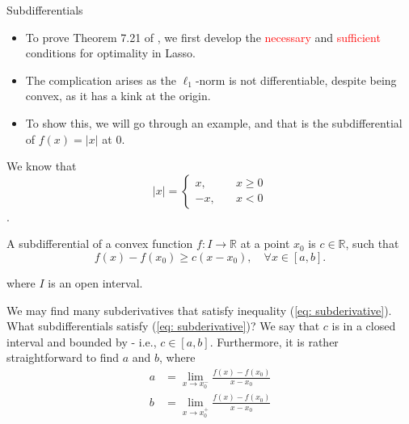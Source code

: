 \documentclass[10pt,handout,english]{beamer}
\newcommand{\R}{\mathbb{R}}
\begin{document}
\begin{frame}[allowframebreaks]{Subdifferentials}
\begin{itemize}
\item To prove Theorem 7.21 of \citet{wainwright2019high}, we first develop the \textcolor{red}{necessary} and \textcolor{red}{sufficient} conditions for optimality in Lasso.\justifying
\item The complication arises as the $\ell_1$-norm is not differentiable, despite being convex, as it has a kink at the origin.\justifying
\item To show this, we will go through an example, and that is the subdifferential of $f(x)=\lvert x\rvert$ at $0$.\justifying 
\end{itemize}
\end{frame}

\begin{frame}[allowframebreaks]
We know that 
\[
\lvert x\rvert=
\begin{cases}
x,\quad &x\geq0\\
-x,\quad &x<0
\end{cases}
\].

A subdifferential of a convex function $f:I\to \R$ at a point $x_0$ is $c\in\R$, such that
\begin{equation}\label{eq: subderivative}
f(x)-f(x_0)\geq c(x-x_0),\quad \forall x\in [a,b].
\end{equation}

where $I$ is an open interval. 

We may find many subderivatives that satisfy inequality (\ref{eq: subderivative}). What subdifferentials satisfy (\ref{eq: subderivative})? We say that $c$ is in a closed interval and bounded by - i.e., $c\in[a,b]$. Furthermore, it is rather straightforward to find $a$ and $b$, where
\begin{align*}
a&=\lim_{x\to x_0^{-}}\frac{f(x)-f(x_0)}{x-x_0}\\
b&=\lim_{x\to x_0^{+}}\frac{f(x)-f(x_0)}{x-x_0}
\end{align*}
\end{frame}
\end{document}
